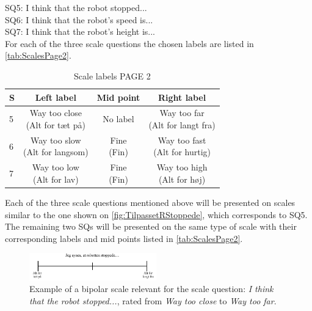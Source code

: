 \noindent
% 
SQ5: I think that the robot stopped... \\%
SQ6: I think that the robot's speed is... \\%
SQ7: I think that the robot's height is... \\%
For each of the three scale questions the chosen labels are listed in \autoref{tab:ScalesPage2}.  
%
\begin{table}[H]
	\centering
\caption{Scale labels PAGE 2}
	\label{tab:ScalesPage2} 
	\begin{tabular}{l|c|c|c}
		S     & Left label & Mid point & Right label \\\hline
		5   & \makecell{Way too close\\(Alt for tæt på)}  & No label & \makecell{Way too far \\(Alt for langt fra)}        \\\hline
		6   & \makecell{Way too slow\\(Alt for langsom)} & \makecell{Fine\\(Fin)} & \makecell{Way too fast \\(Alt for hurtig)}         \\\hline
		7   & \makecell{Way too low \\(Alt for lav)} & \makecell{Fine\\(Fin)} & \makecell{Way too high\\(Alt for høj)}                
	\end{tabular}        
\end{table}
\noindent
%
Each of the three scale questions mentioned above will be presented on scales similar to the one shown on \autoref{fig:TilpassetRStoppede}, which corresponds to SQ5. The remaining two SQs will be presented on the same type of scale with their corresponding labels and mid points listed in \autoref{tab:ScalesPage2}.  
%
\begin{figure}[H]
\centering
\includegraphics[width = 0.49\textwidth]{Figure/TilpassetRStoppede}
\setlength{} 
\caption{Example of a bipolar scale relevant for the scale question: \textit{I think that the robot stopped...}, rated from \textit{Way too close} to \textit{Way too far}.}
\label{fig:TilpassetRStoppede}
\end{figure}
